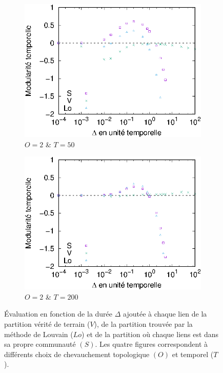 \begin{figure}[h]
	\begin{subfigure}{0.35\textwidth}
		\includegraphics[width=\textwidth]{img/Qualite/Fonc/comp_50_T_50_O_2_Q_1.eps}
		\caption{$O=2$ \& $T=50$}
		\label{fig:versqualite_fonc_test3}
	\end{subfigure}
	\begin{subfigure}{0.35\textwidth}
		\includegraphics[width=\textwidth]{img/Qualite/Fonc/comp_100_T_200_O_2_Q_1.eps}
		\caption{$O=2$ \& $T=200$}
		\label{fig:versqualite_fonc_test4}
	\end{subfigure}	
	\caption{Évaluation en fonction de la durée $\Delta$ ajoutée à chaque lien de la partition vérité de terrain ($V$), de la partition trouvée par la méthode de Louvain ($Lo$) et de la partition où chaque liens est dans sa propre communauté $(S)$.
	Les quatre figures correspondent à différents choix de chevauchement topologique $(O)$ et temporel ($T$).}
	\label{fig:versqualite_fonc_test}
\end{figure}
\bigskip

